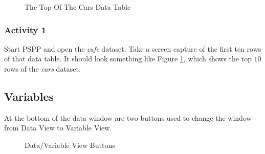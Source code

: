 \begin{figure}[H]
  \begin{center}
    \caption{The Top Of The Cars Data Table}
    \label{lab01_fig05}
  \end{center}
\end{figure}

\subsubsection{Activity 1} \label{lab01_act01}

Start \acs{PSPP} and open the \textit{cafe} dataset. Take a screen capture of the first ten rows of that data table. It should look something like Figure \ref{lab01_fig05}, which shows the top $ 10 $ rows of the \textit{cars} dataset.

\subsection{Variables}

At the bottom of the data window are two buttons used to change the window from Data View to Variable View. 

\begin{figure}[H]
  \begin{center}
    \caption{Data/Variable View Buttons}
    \label{lab01_fig06}
  \end{center}
\end{figure}

